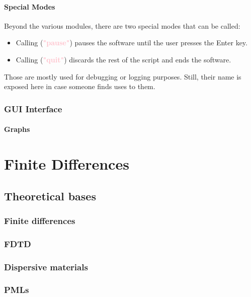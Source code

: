 \documentclass[a4paper,11pt]{book}
\newcommand{\lfc}[1]{\textbf{\color{blue}{#1}}}
\newcommand{\lsg}[1]{\textbf{\textcolor{pink}{"#1"}}}
\begin{document}
\subsection{Special Modes}

Beyond the various modules, there are two special modes that can be called:
\begin{itemize}
	\item Calling \lfc{MODE}(\lsg{pause}) pauses the software until the user presses the Enter key.
	\item Calling \lfc{MODE}(\lsg{quit}) discards the rest of the script and ends the software.
\end{itemize}
Those are mostly used for debugging or logging purposes. Still, their name is exposed here in case someone finds uses to them.

\section{GUI Interface}

\subsection{Graphs}





\part{Finite Differences}

\chapter{Theoretical bases}

\section{Finite differences}

\section{FDTD}

\section{Dispersive materials}

\section{PMLs}
\end{document}
